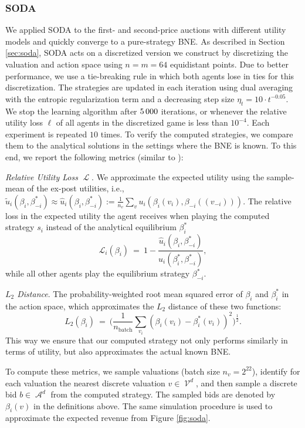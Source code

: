 \documentclass{article}
\DeclareMathOperator{\Acal}{\mathcal{A}}
\DeclareMathOperator{\Lcal}{\mathcal{L}}
\DeclareMathOperator{\Vcal}{\mathcal{V}}
\begin{document}
\begin{appendix}
\subsubsection{SODA} \label{app:soda}
We applied SODA to the first- and second-price auctions with different utility models and quickly converge to a pure-strategy BNE. 
As described in Section \ref{sec:soda}, SODA acts on a discretized version we construct by discretizing the valuation and action space using $n=m=64$ equidistant points. Due to better performance, we use a tie-breaking rule in which both agents lose in ties for this discretization. The strategies are updated in each iteration using dual averaging with the entropic regularization term and a decreasing step size $\eta_t = 10 \cdot t^{-0.05}$. We stop the learning algorithm after $5\thinspace000$ iterations, or whenever the relative utility loss $\ell$ of all agents in the discretized game is less than $10^{-4}$. Each experiment is repeated $10$ times. To verify the computed strategies, we compare them to the analytical solutions in the settings where the BNE is known. To this end, we report the following metrics (similar to \cite{bichler2021npga, bichler2023soda}):
\begin{description}
	\item \textit{Relative Utility Loss} $\Lcal$. We approximate the expected utility using the sample-mean of the ex-post utilities, i.e., $ \tilde u_i (\beta_i, \beta^*_{-i}) \approx  \hat u_i (\beta_i, \beta^*_{-i}) := \tfrac{1}{n_v} \sum_{v} u_i( \beta_i(v_i), \beta_{-i}((v_{-i}))) $. The relative loss in the expected utility the agent receives when playing the computed strategy $s_i$ instead of the analytical equilibrium $\beta_i^*$
	\begin{equation} \label{eq:util_loss}
		\mathcal L_i(\beta_i)\ =\ 1 - \frac{\hat u_i(\beta_i, \beta^*_{-i})}{\hat u_i(\beta^*_i,\beta^*_{-i})},
	\end{equation}
	while all other agents play the equilibrium strategy $\beta^*_{-i}$.
	\item \textit{$L_2$ Distance}. The probability-weighted root mean squared error of $\beta_i$ and $\beta^*_i$ in the action space, which approximates the $L_2$ distance of these two functions:
	\begin{equation}
		L_2(\beta_i)\ =\ \bigg(\frac{1}{n_\text{batch}}\sum_{v_i}\left(\beta_i(v_{i}) - \beta^*_i(v_{i})\right)^2\bigg)^\frac{1}{2}.
	\end{equation}
	This way we ensure that our computed strategy not only performs similarly in terms of utility, but also approximates the actual known BNE.
\end{description}
To compute these metrics, we sample valuations (batch size $n_v = 2^{22}$), identify for each valuation the nearest discrete valuation  $v \in \Vcal^d$, and then sample a discrete bid $b \in \Acal^d$ from the computed strategy. The sampled bids are denoted by $\beta_i(v)$ in the definitions above. The same simulation procedure is used to approximate the expected revenue from Figure \ref{fig:soda}.


\end{appendix}
\end{document}
